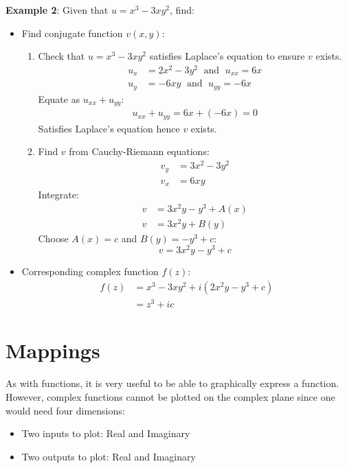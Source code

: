 \documentclass[10pt,a4paper]{article}
\begin{document}
\textbf{Example 2}: Given that $u=x^3-3xy^2$, find:
\begin{itemize}
    \item Find conjugate function $v(x,y)$:
    \begin{enumerate}
        \item Check that $u=x^3-3xy^2$ satisfies Laplace's equation to ensure $v$ exists.
            \begin{align*}
                u_x &= 2x^2-3y^2\; \text{ and }\; u_{xx}=6x \\
                u_y &= -6xy \;\text{ and }\; u_{yy}=-6x 
            \end{align*}
            Equate as $u_{xx}+u_{yy}$:
            \begin{align*}
                u_{xx}+u_{yy} = 6x + (-6x) = 0
            \end{align*}
            Satisfies Laplace's equation hence $v$ exists.

        \item Find $v$ from Cauchy-Riemann equations:
        \begin{align*}
            v_y &= 3x^2 - 3y^2 \\
            v_x &= 6xy 
        \end{align*}
        Integrate:
        \begin{align*}
            v &= 3x^2y - y^3 + A(x) \\
            v &= 3x^2y + B(y)
        \end{align*}
        Choose $A(x) = c$ and $B(y)=-y^3+c$:
        $$
            v = 3x^2y - y^3 + c
        $$
    \end{enumerate}

    \item Corresponding complex function $f(z)$:
    \begin{align*}
        f(z) &= x^3 - 3xy^2 + i(2x^2y - y^3 + c) \\
        &= z^3 + ic 
    \end{align*}
\end{itemize}

\pagebreak

\section{Mappings}

As with functions, it is very useful to be able to graphically express a function. However, complex
functions cannot be plotted on the complex plane since one would need four dimensions:
\begin{itemize}
    \item Two inputs to plot: Real and Imaginary 
    \item Two outputs to plot: Real and Imaginary
\end{itemize}
\end{document}
